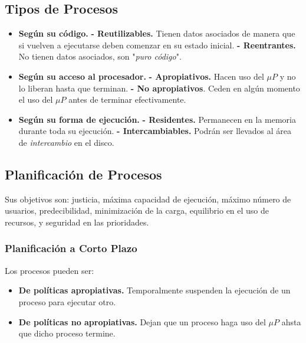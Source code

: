 \documentclass[10pt,a4paper]{article}
\begin{document}
\subsection{Tipos de Procesos}
\begin{itemize}
\item \textbf{Según su código.}
\subitem \textbf{- Reutilizables.} Tienen datos asociados de manera que si vuelven a ejecutarse deben comenzar en su estado inicial.
\subitem \textbf{- Reentrantes.} No tienen datos asociados, son "\textit{puro código}".

\item \textbf{Según su acceso al procesador.}
\subitem \textbf{- Apropiativos.} Hacen uso del $\mu P$ y no lo liberan hasta que terminan.
\subitem \textbf{- No apropiativos}. Ceden en algún momento el uso del $\mu P$ antes de terminar efectivamente.

\item \textbf{Según su forma de ejecución.}
\subitem \textbf{- Residentes.} Permanecen en la memoria durante toda su ejecución.
\subitem \textbf{- Intercambiables.} Podrán ser llevados al área de \textit{intercambio} en el disco.
\end{itemize}

\subsection{Planificación de Procesos}
Sus objetivos son: justicia, máxima capacidad de ejecución, máximo número de usuarios, predecibilidad, minimización de la carga, equilibrio en el uso de recursos, y seguridad en las prioridades.

\subsubsection{Planificación a Corto Plazo}
Los procesos pueden ser:
\begin{itemize}
\item \textbf{De políticas apropiativas.} Temporalmente suspenden la ejecución de un proceso para ejecutar otro.
\item \textbf{De políticas no apropiativas.} Dejan que un proceso haga uso del $\mu P$ ahsta que dicho proceso termine.
\end{itemize}
\end{document}
